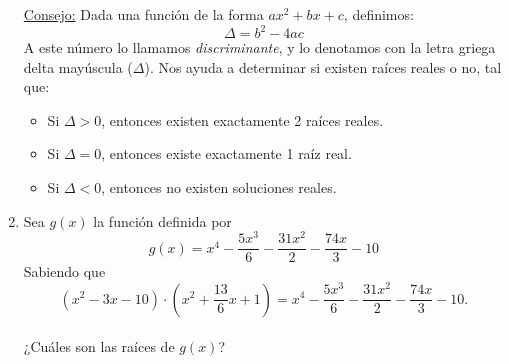\documentclass{article}
\begin{document}
\begin{enumerate}[label=\textsc{\roman*}.]
    \ul{Consejo:} Dada una función de la forma $ax^2 + bx + c$, definimos:
        \begin{equation*}
            \Delta = b^2 - 4ac
        \end{equation*}
    A este número lo llamamos \textit{discriminante}, y lo denotamos con la letra griega delta mayúscula ($\Delta$). Nos ayuda a determinar si existen raíces reales o no, tal que:
    \begin{itemize}[label=$\cdot$]
        \item Si $\Delta > 0$, entonces existen exactamente 2 raíces reales.
        \item Si $\Delta = 0$, entonces existe exactamente 1 raíz real.
        \item Si $\Delta < 0$, entonces no existen soluciones reales.
    \end{itemize}
    
    \item Sea $g(x)$ la función definida por
    \begin{equation*}
        g(x) = x^4 - \frac{5 x^3}{6} - \frac{31 x^2}{2} - \frac{74 x}{3} - 10
    \end{equation*}
    Sabiendo que 
    \begin{equation*}
    (x^2 - 3 x - 10) \cdot (x^2 + \frac{13}{6}x + 1) = x^4 - \frac{5 x^3}{6} - \frac{31 x^2}{2} - \frac{74 x}{3} - 10.
    \end{equation*}
    \\ ¿Cuáles son las raíces de $g(x)$?
\end{enumerate}

\newpage
\end{document}
